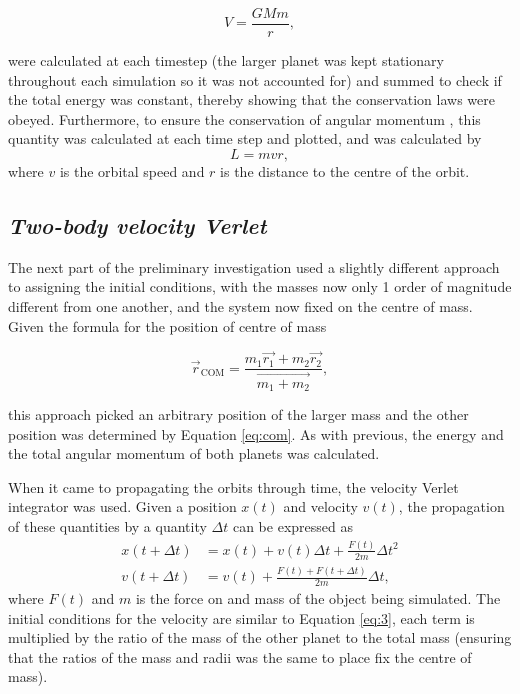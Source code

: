 \documentclass[11pt, english]{report}
\begin{document}
\begin{equation}
    V = \frac{GMm}{r},
\end{equation}

\noindent were calculated at each timestep (the larger planet was kept stationary throughout each simulation so it was not accounted for) and summed to check if the total energy was constant, thereby showing that the conservation laws were obeyed. Furthermore, to ensure the conservation of angular momentum \cite{noauthor_angular_nodate}, this quantity was calculated at each time step and plotted, and was calculated by 
\begin{equation}
    L = mvr,
\end{equation} where $v$ is the orbital speed and $r$ is the distance to the centre of the orbit.

\subsection{\textsl{Two-body velocity Verlet}}
\normalsize{
\noindent The next part of the preliminary investigation used a slightly different approach to assigning the initial conditions, with the masses now only 1 order of magnitude different from one another, and the system now fixed on the centre of mass. Given the formula for the position of centre of mass \cite{bowler_phas0030_nodate}

\begin{equation} \label{eq:com}
    \vec{r}_{\mathrm{COM}} = \frac{m_1\vec{r_1} + m_2\vec{r_2}}{\vec{m_1 + m_2}},
\end{equation}

\noindent this approach picked an arbitrary position of the larger mass and the other position was determined by Equation \ref{eq:com}. As with previous, the energy and the total angular momentum of both planets was calculated.

When it came to propagating the orbits through time, the velocity Verlet integrator \cite{bowler_phas0030_nodate} was used. Given a position $x(t)$ and velocity $v(t)$, the propagation of these quantities by a quantity $\Delta t$ can be expressed as 
\begin{align}
    x(t + \Delta t) &= x(t) + v(t)\Delta t  + \frac{F(t)}{2m} \Delta t^2 \\ 
    v(t + \Delta t) &= v(t) + \frac{F(t) + F(t + \Delta t)}{2m} \Delta t,
\end{align} where $F(t)$ and $m$ is the force on and mass of the object being simulated.
The initial conditions for the velocity are similar to Equation \ref{eq:3}, each term is multiplied by the ratio of the mass of the other planet to the total mass (ensuring that the ratios of the mass and radii was the same to place fix the centre of mass). 
}
\end{document}
